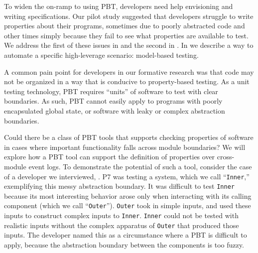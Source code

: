 \iflater{} 

\fi

%
%
To widen the on-ramp to using PBT, developers need help envisioning and writing
specifications. Our pilot study suggested that developers struggle to write
properties about their programs, sometimes due to poorly abstracted code and
other times simply because they fail to see what properties are available to
test. We address the first of these issues in  and
the second in .
%
In  we describe a way to automate a
specific high-leverage scenario: model-based testing.

A common pain point for developers in our formative research
was that code may not be organized in a way that is conducive to property-based
testing. As a unit testing technology, PBT requires ``units'' of software to
test with clear boundaries. As such, PBT cannot easily apply to programs with
poorly encapsulated global state, or software with leaky or complex abstraction
boundaries.

Could there be a class of PBT tools that supports checking properties of
software in cases where important functionality falls across module boundaries?
We will explore how a PBT tool can support the definition of properties over
cross-module event logs. To demonstrate the potential of such a tool, consider
the case of a developer we interviewed, . P7 was testing
a system, which we call ``\lstinline{Inner},'' exemplifying this messy
abstraction
boundary. It was difficult to test \lstinline{Inner} because
its most interesting behavior arose only when interacting with its calling
component (which we call ``\lstinline{Outer}'').
\lstinline{Outer} took in simple inputs, and used these inputs to construct
complex inputs to \lstinline{Inner}. \lstinline{Inner} could not be tested with
realistic inputs without the complex apparatus of \lstinline{Outer} that
produced those inputs. The developer named this as a circumstance where a
PBT is difficult to apply, because the abstraction boundary between the
components is too fuzzy.

